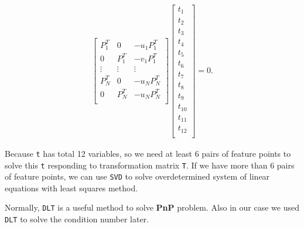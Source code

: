 \begin{align}\label{equ:dlt}
 \begin{bmatrix} P_1^T & 0 & -u_1P_1^T\\
                 0 & P_1^T & -v_1P_1^T\\
                 \vdots & \vdots & \vdots\\
                 P_N^T & 0 & -u_NP_N^T\\
                 0 & P_N^T & -u_NP_N^T\\ \end{bmatrix} 
 \begin{bmatrix} t_1 \\ t_2 \\ t_3 \\ t_4 \\
                 t_5 \\ t_6 \\ t_7 \\ t_8 \\
                 t_9 \\ t_{10} \\ t_{11} \\ t_{12} \\ \end{bmatrix} 
 = 0.         
\end{align}

Because \texttt{t} has total 12 variables, so we need at least 6 pairs of feature points to solve this \texttt{t} responding to transformation matrix \texttt{T}. If we have more than 6 pairs of feature points, we can use \texttt{SVD} to solve overdetermined system of linear equations with least squares method.

Normally, \texttt{DLT} is a useful method to solve \textbf{PnP} problem. Also in our case we used \texttt{DLT} to solve the condition number later.